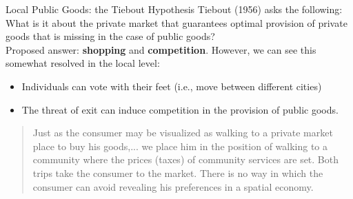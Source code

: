 \documentclass[8pt]{extarticle}
\begin{document}
  \begin{problem}{Local Public Goods: the Tiebout Hypothesis}
    Tiebout (1956) asks the following: What is it about the private market that guarantees optimal provision of private goods that is missing in the case of public goods?\\

    Proposed answer: \textbf{shopping} and \textbf{competition}. However, we can see this somewhat resolved in the local level:
    \begin{itemize}
      \item Individuals can vote with their feet (i.e., move between different cities)
      \item The threat of exit can induce competition in the provision of public goods.
    \end{itemize}
    \begin{quote}
        Just as the consumer may be visualized as walking to a private market place to buy his goods,... we place him in the position of walking to a community where the prices (taxes) of community services are set. Both trips take the consumer to the market. There is no way in which the consumer can avoid revealing his preferences in a spatial economy.
    \end{quote}
  \end{problem}
\end{document}
